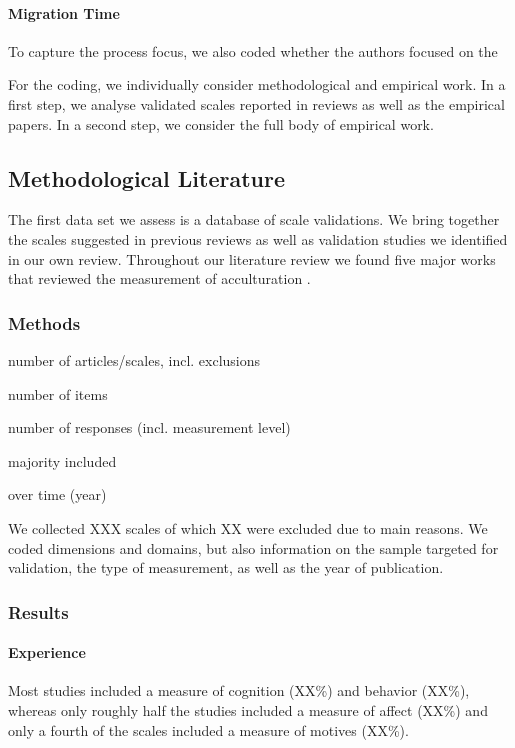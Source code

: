\documentclass[man, 12pt, a4paper]{apa7}
\begin{document}
\paragraph{Migration Time}
To capture the process focus, we also coded whether the authors focused on the 

For the coding, we individually consider methodological and empirical work. In a first step, we analyse validated scales reported in reviews as well as the empirical papers. In a second step, we consider the full body of empirical work.

\subsection{Methodological Literature}
The first data set we assess is a database of scale validations. We bring together the scales suggested in previous reviews as well as validation studies we identified in our own review. Throughout our literature review we found five major works that reviewed the measurement of acculturation \citep{Celenk2011, Maestas2000, Matsudaira2006, Wallace2010, Zane2004}.

\subsubsection{Methods}
number of articles/scales, incl. exclusions

number of items

number of responses (incl. measurement level)

majority included

over time (year)

We collected XXX scales of which XX were excluded due to main reasons. We coded dimensions and domains, but also information on the sample targeted for validation, the type of measurement, as well as the year of publication.

\subsubsection{Results}

\paragraph{Experience}
Most studies included a measure of cognition (XX\%) and behavior (XX\%), whereas only roughly half the studies included a measure of affect (XX\%) and only a fourth of the scales included a measure of motives (XX\%).
\end{document}

